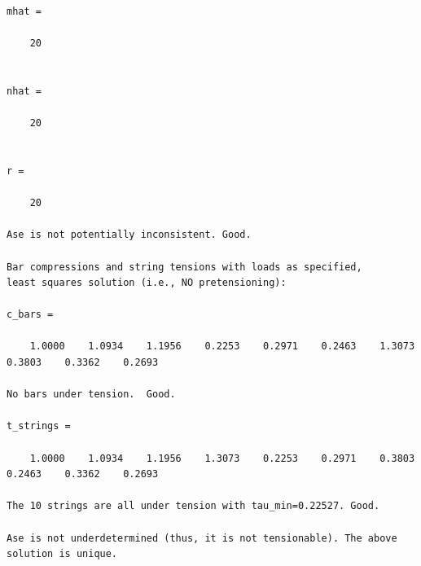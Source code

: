 \documentclass{article}
\begin{document}
\begin{lstlisting}[caption={Ouput of MitchellTruss4.m},captionpos=t, label={lst:p1}]
mhat =

    20


nhat =

    20


r =

    20

Ase is not potentially inconsistent. Good.

Bar compressions and string tensions with loads as specified,
least squares solution (i.e., NO pretensioning):

c_bars =

    1.0000    1.0934    1.1956    0.2253    0.2971    0.2463    1.3073    0.3803    0.3362    0.2693

No bars under tension.  Good.

t_strings =

    1.0000    1.0934    1.1956    1.3073    0.2253    0.2971    0.3803    0.2463    0.3362    0.2693

The 10 strings are all under tension with tau_min=0.22527. Good.

Ase is not underdetermined (thus, it is not tensionable). The above solution is unique.
\end{lstlisting}
\end{document}
